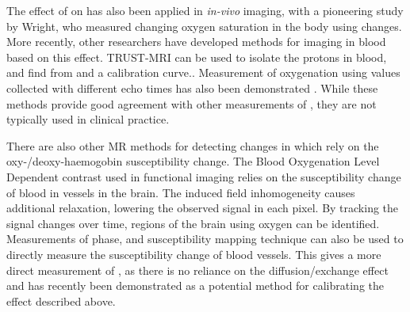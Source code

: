 The effect of \SOtwo on \Ttwo has also been applied in \textit{in-vivo} imaging, with a pioneering study by Wright\cite{WrightEstimatingoxygensaturation1991}, who measured changing oxygen saturation in the body using \Ttwo changes.
More recently, other researchers have developed methods for imaging \SOtwo in blood based on this \Ttwo effect\cite{RodgersMRIbasedmethodsquantification2016}.
TRUST-MRI can be used to isolate the protons in blood, and find \SOtwo from \Ttwo and a calibration curve.\cite{LuQuantitativeevaluationoxygenation2008}.
Measurement of oxygenation using \Ttwo values collected with different echo times has also been demonstrated \cite{VargheseCMRbasedbloodoximetry2017}.
While these methods provide good agreement with other measurements of \SOtwo, they are not typically used in clinical practice.

There are also other MR methods for detecting changes in \SOtwo which rely on the oxy-/deoxy-haemogobin susceptibility change.
The Blood Oxygenation Level Dependent contrast used in functional imaging relies on the susceptibility change of blood in vessels in the brain.
The induced field inhomogeneity causes additional \Ttwostar relaxation, lowering the observed signal in each pixel.
By tracking the signal changes over time, regions of the brain using oxygen can be identified.
Measurements of phase, and susceptibility mapping technique can also be used to directly measure the susceptibility change of blood vessels\cite{Haackevivomeasurementblood1997,Fernandez-SearaMRsusceptometrymeasuring2006a,JainInvestigatingmagneticsusceptibility2012}.
This gives a more direct measurement of \SOtwo, as there is no reliance on the diffusion/exchange effect and has recently been demonstrated as a potential method for calibrating the \Ttwo effect described above.\cite{LanghamvivowholebloodT22018}
